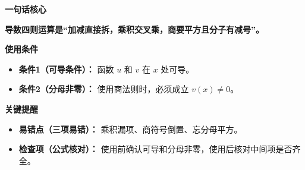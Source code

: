 \begin{summarybox}

	\textbf{\textcolor{CSummary}{一句话核心}}

	\textbf{导数四则运算是“加减直接拆，乘积交叉乘，商要平方且分子有减号”。}

	\medskip
	\textbf{\textcolor{CSummary}{使用条件}}
	\begin{itemize}[leftmargin=*, itemsep=0.5em, topsep=0.4em]
		\item \textbf{条件1（可导条件）：} 函数 $u$ 和 $v$ 在 $x$ 处可导。
		\item \textbf{条件2（分母非零）：} 使用商法则时，必须成立 $v(x)\neq 0$。
	\end{itemize}

	\medskip
	\textbf{\textcolor{CSummary}{关键提醒}}
	\begin{itemize}[leftmargin=*, itemsep=0.5em, topsep=0.4em]
		\item \textbf{易错点（三项易错）：} 乘积漏项、商符号倒置、忘分母平方。
		\item \textbf{检查项（公式核对）：} 使用前确认可导和分母非零，使用后核对中间项是否齐全。
	\end{itemize}
\end{summarybox}
